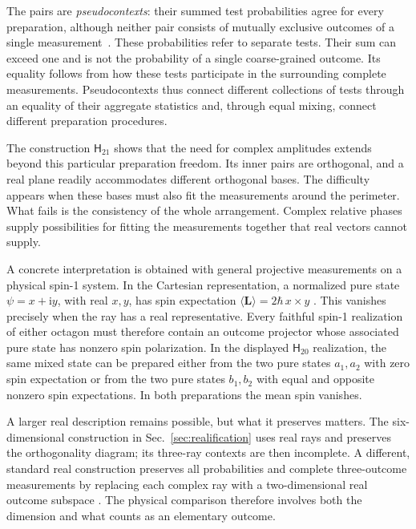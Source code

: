 \documentclass[twocolumn,aps,pra,floatfix,amsmath,amssymb,longbibliography]{revtex4-2}
\theoremstyle{definition}
\theoremstyle{remark}
\newcommand{\ii}{\mathrm{i}}
\newcommand{\Htwenty}{\mathsf H_{20}}
\newcommand{\Htwentyone}{\mathsf H_{21}}
\begin{document}
The pairs are \emph{pseudocontexts}: their summed test probabilities agree
for every preparation, although neither pair consists of mutually exclusive
outcomes of a single measurement~\cite{2026-Navara-Svozil-pseudocontexts}.
These probabilities refer to separate tests.  Their sum can exceed one and
is not the probability of a single coarse-grained outcome.  Its equality
follows from how these tests participate in the surrounding complete
measurements.  Pseudocontexts thus
connect different collections of tests through an equality of their
aggregate statistics and, through equal mixing, connect different
preparation procedures.

The construction $\Htwentyone$ shows that the need for complex amplitudes
extends beyond this particular preparation freedom.  Its inner pairs are
orthogonal, and a real plane readily accommodates different orthogonal
bases.  The difficulty appears when these bases must also fit the
measurements around the perimeter.  What fails is the consistency of the
whole arrangement.  Complex relative phases supply possibilities for
fitting the measurements together that real vectors cannot supply.

A concrete interpretation is obtained with general projective measurements
on a physical spin-1 system.  In the Cartesian representation, a normalized
pure state $\psi=x+\ii y$, with real $x,y$, has spin expectation
$\langle\mathbf L\rangle=2\hbar\,x\times y$
\cite{ZiboldEtAl2016SpinNematic}.  This vanishes precisely when the ray has
a real representative.  Every faithful spin-1 realization of either
octagon must therefore contain an outcome projector whose associated pure
state has nonzero spin polarization.  In the displayed $\Htwenty$
realization, the same mixed state can be prepared either from the two pure
states $a_1,a_2$ with zero spin expectation or from the two pure states
$b_1,b_2$ with equal and opposite nonzero spin expectations.  In both
preparations the mean spin vanishes.

A larger real description remains possible, but what it preserves matters.
The six-dimensional construction in Sec.~\ref{sec:realification} uses real
rays and preserves the orthogonality diagram; its three-ray contexts are
then incomplete.  A different, standard real construction preserves all
probabilities and complete three-outcome measurements by replacing each
complex ray with a two-dimensional real outcome subspace
\cite{McKague2009SimulatingRealHilbert,Aleksandrova2013UniversalQubit}.
The physical comparison therefore involves both the dimension and what
counts as an elementary outcome.
\end{document}
